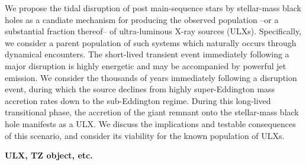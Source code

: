 
We propose the tidal disruption of post main-sequence stars by stellar-mass black holes as a candiate mechanism for
producing the observed population --or a substantial fraction thereof-- of ultra-luminous X-ray sources (ULXs).   Specifically, we consider a parent population of such systems which naturally occurs through dynamical encounters.  The short-lived transient event immediately following a major disruption is highly energetic and may be 
accompanied by powerful jet emission.  We consider the thousands of years immediately following a disruption event, during which the source declines from highly super-Eddington mass accretion rates down to the sub-Eddington regime.  During this long-lived transitional phase, the accretion of the giant remnant onto the stellar-mass black hole manifests as a ULX.   We discuss the implications and testable consequences of this scenario, and consider its viability for the known population of ULXs.


{\bf ULX, TZ object, etc.}

